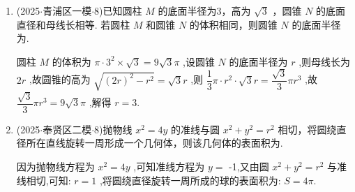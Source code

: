 \begin{enumerate}
    \item (2025$\cdot$青浦区一模$\cdot$8)已知圆柱 $M$ 的底面半径为3，高为 $\sqrt{3}$ ，圆锥 $N$ 的底面直径和母线长相等. 若圆柱 $M$ 和圆锥 $N$ 的体积相同，则圆锥 $N$ 的底面半径为.
    \begin{jieda}
        圆柱 $M$ 的体积为 $\pi  \cdot  {3}^{2} \times  \sqrt{3} = 9\sqrt{3}\pi$ ,设圆锥 $N$ 的底面半径为 $r$ ,则母线长为 ${2r}$ ,故圆锥的高为 $\sqrt{{\left( 2r\right) }^{2} - {r}^{2}} =  \sqrt{3}r$ ,则 $\dfrac{1}{3}\pi  \cdot  {r}^{2} \cdot  \sqrt{3}r = \dfrac{\sqrt{3}}{3}\pi {r}^{3}$ ,故 $\dfrac{\sqrt{3}}{3}\pi {r}^{3} = 9\sqrt{3}\pi$ ,解得 $r = 3$.
    \end{jieda}

    \item (2025$\cdot$奉贤区二模$\cdot$8)抛物线 ${x}^{2} = {4y}$ 的准线与圆 ${x}^{2} + {y}^{2} = {r}^{2}$ 相切，将圆绕直径所在直线旋转一周形成一个几何体，则该几何体的表面积为\blkda[2]{${4\pi }$}.
    \begin{jieda}
        因为抛物线方程为 ${x}^{2} = {4y}$ ,可知准线方程为 $y =$ -1,又由圆 ${x}^{2} + {y}^{2} = {r}^{2}$ 与准线相切,可知: $r = 1$ ,将圆绕直径旋转一周所成的球的表面积为: $S = {4\pi }$.
    \end{jieda}
\end{enumerate}
